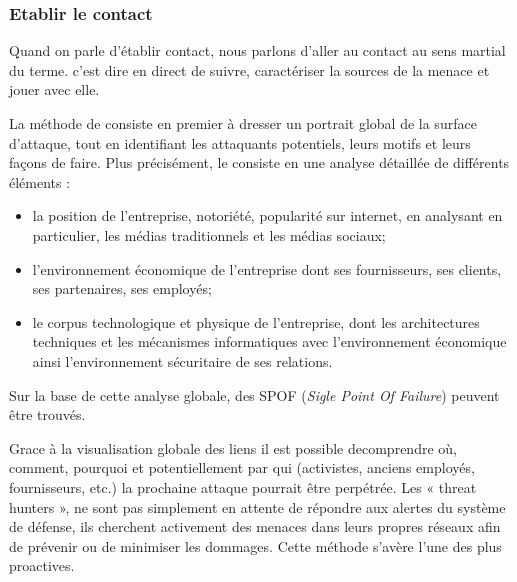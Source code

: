\subsubsection{Etablir le contact}

Quand on parle d'établir contact, nous parlons d'aller au contact au sens martial du terme. c'est dire en direct de suivre, caractériser la sources de la menace et jouer avec elle.

La méthode de  consiste en premier à dresser un portrait global de la surface d’attaque, tout en identifiant les attaquants potentiels, leurs motifs et leurs façons de faire. Plus précisément, le  consiste en une analyse détaillée de différents éléments :

\begin{itemize}
	\item la position de  l’entreprise,  notoriété, popularité sur internet, en analysant en particulier,  les médias traditionnels et les médias sociaux;
	\item l'environnement économique de l’entreprise dont ses fournisseurs, ses clients, ses partenaires, ses employés;
	\item le corpus technologique et physique de l'entreprise, dont les architectures techniques et les mécanismes informatiques avec l'environnement économique ainsi l'environnement sécuritaire de ses relations.
\end{itemize}

Sur la base de cette analyse globale, des SPOF (\textit{Sigle Point Of Failure}) peuvent être trouvés. 

Grace à la visualisation  globale des liens il est possible  decomprendre où, comment, pourquoi et potentiellement par qui (activistes, anciens employés, fournisseurs, etc.) la prochaine attaque pourrait être perpétrée. 
Les « threat hunters », ne sont pas simplement en attente de répondre aux alertes du système de défense, ils cherchent activement des menaces dans leurs propres réseaux afin de prévenir ou de minimiser les dommages. Cette méthode s’avère l’une des plus proactives. 


